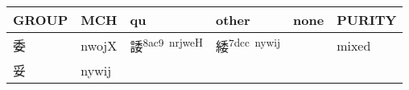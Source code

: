 \documentclass[14pt,a4paper]{scrartcl}
\begin{document}
\begin{longtable}[c]{@{}llllll@{}}
\toprule
\begin{minipage}[b]{0.14\columnwidth}\raggedright\strut
GROUP
\strut\end{minipage} &
\begin{minipage}[b]{0.14\columnwidth}\raggedright\strut
MCH
\strut\end{minipage} &
\begin{minipage}[b]{0.14\columnwidth}\raggedright\strut
qu
\strut\end{minipage} &
\begin{minipage}[b]{0.14\columnwidth}\raggedright\strut
other
\strut\end{minipage} &
\begin{minipage}[b]{0.14\columnwidth}\raggedright\strut
none
\strut\end{minipage} &
\begin{minipage}[b]{0.14\columnwidth}\raggedright\strut
PURITY
\strut\end{minipage}\tabularnewline
\midrule
\endhead
\begin{minipage}[t]{0.14\columnwidth}\raggedright\strut
委
\strut\end{minipage} &
\begin{minipage}[t]{0.14\columnwidth}\raggedright\strut
nwojX
\strut\end{minipage} &
\begin{minipage}[t]{0.14\columnwidth}\raggedright\strut
諉\textsuperscript{8ac9~nrjweH}
\strut\end{minipage} &
\begin{minipage}[t]{0.14\columnwidth}\raggedright\strut
緌\textsuperscript{7dcc~nywij}
\strut\end{minipage} &
\begin{minipage}[t]{0.14\columnwidth}\raggedright\strut
\strut\end{minipage} &
\begin{minipage}[t]{0.14\columnwidth}\raggedright\strut
mixed
\strut\end{minipage}\tabularnewline
\begin{minipage}[t]{0.14\columnwidth}\raggedright\strut
妥
\strut\end{minipage} &
\begin{minipage}[t]{0.14\columnwidth}\raggedright\strut
nywij
\strut\end{minipage} &
\begin{minipage}[t]{0.14\columnwidth}\raggedright\strut
\strut\end{minipage} &

\end{longtable}
\end{document}
